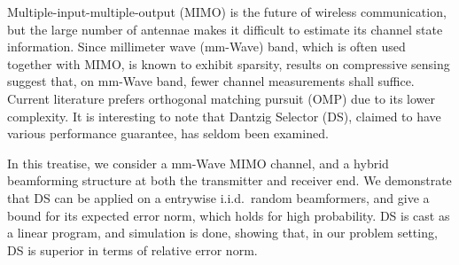 
\starttitle [title={Abstract}]

Multiple-input-multiple-output (MIMO) is the future of wireless communication, but the large number of antennae makes it difficult to estimate its channel state information.
Since millimeter wave (mm-Wave) band, which is often used together with MIMO, is known to exhibit sparsity, results on compressive sensing suggest that, on mm-Wave band, fewer channel measurements shall suffice.
Current literature prefers orthogonal matching pursuit (OMP) due to its lower complexity.
It is interesting to note that Dantzig Selector (DS), claimed to have various performance guarantee, has seldom been examined.

In this treatise, we consider a mm-Wave MIMO channel, and a hybrid beamforming structure at both the transmitter and receiver end.
We demonstrate that DS can be applied on a entrywise i.i.d.\ random beamformers, and give a bound for its expected error norm, which holds for high probability.
DS is cast as a linear program, and simulation is done, showing that, in our problem setting, DS is superior in terms of relative error norm.


\stoptitle
